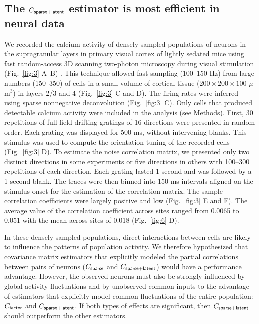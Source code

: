 \subsection*{The $C_{\sf sparse+latent}$ estimator is most efficient in neural data}

We recorded the calcium activity of densely sampled populations of neurons in the supragranular layers in primary visual cortex of lightly sedated mice using fast random-access 3D scanning two-photon microscopy during visual stimulation (Fig.~\ref{fig:3} A--B) \cite{Reddy:2005, Katona:2012, Cotton:2013}. This technique allowed fast sampling (100--150 Hz) from large numbers (150--350) of cells in a small volume of cortical tissue ($200\times200\times100$ $\mu$m$^3$) in layers 2/3 and 4 (Fig.~\ref{fig:3} C and D).  The firing rates were inferred using sparse nonnegative deconvolution \cite{Vogelstein:2010} (Fig.~\ref{fig:3} C). Only cells that produced detectable calcium activity were included in the analysis (see Methods).  First, 30 repetitions of full-field drifting gratings of 16 directions were presented in random order.  Each grating was displayed for 500 ms, without intervening blanks.  This stimulus was used to compute the orientation tuning of the recorded cells (Fig.~\ref{fig:3} D). To estimate the noise correlation matrix, we presented only two distinct directions in some experiments or five directions in others with 100--300 repetitions of each direction. Each grating lasted 1 second and was followed by a 1-second blank.  The traces were then binned into 150 ms intervals aligned on the stimulus onset for the estimation of the correlation matrix.   The sample correlation coefficients were largely positive and low (Fig.~\ref{fig:3} E and F). The average value of the correlation coefficient across sites ranged from 0.0065 to 0.051 with the mean across sites of 0.018 (Fig.~\ref{fig:6} D).

In these densely sampled populations, direct interactions between cells are likely to influence the patterns of population activity.  We therefore hypothesized that covariance matrix estimators that explicitly modeled the partial correlations between pairs of neurons ($C_{\sf sparse}$ and $C_{\sf sparse+latent}$) would have a performance advantage.  However, the observed neurons must also be strongly influenced by global activity fluctuations and by unobserved common inputs to the advantage of estimators that explicitly model common fluctuations of the entire population: $C_{\sf factor}$ and $C_{\sf sparse+latent}$.  If both types of effects are significant, then $C_{\sf sparse+latent}$ should outperform the other estimators.

